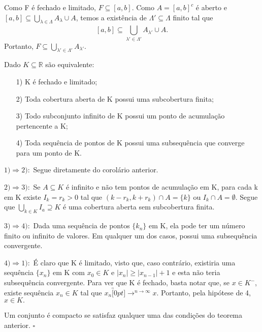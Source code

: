 \documentclass[analysis_notes.tex]{subfiles}
\begin{document}
\begin{proof*}
	Como F é fechado e limitado, $F\subseteq{[a,b]}$. Como $A=[a,b]^{c}$ é aberto e $[a,b]\subseteq{\bigcup_{\lambda \in\Lambda }^{}{A_{\lambda }}\cup{A}}$, temos
	a existência de $\Lambda '\subseteq{\Lambda }$ finito tal que
	$$
		[a,b] \subseteq{\bigcup_{\lambda '\in\Lambda '}^{}{A_{\lambda '}}\cup{A}}.
	$$
	Portanto, $F\subseteq{\bigcup_{\lambda '\in\Lambda '}^{}{A_{\lambda '}}}.$ \qedsymbol
\end{proof*}
\begin{theorem*}
	Dado $K\subseteq{\mathbb{R}}$ são equivalente:
	\begin{itemize}
		\item[1)] K é fechado e limitado;
		\item[2)] Toda cobertura aberta de K possui uma subcobertura finita;
		\item[3)] Todo subconjunto infinito de K possui um ponto de acumulação pertencente a K;
		\item[4)] Toda sequência de pontos de K possui uma subsequência que converge para um ponto de K.
	\end{itemize}
\end{theorem*}
\begin{proof*}
	$1) \Rightarrow 2):$ Segue diretamente do corolário anterior.

	$2) \Rightarrow 3):$ Se $A\subseteq{K}$ é infinito e não tem pontos de acumulação em K, para cada k em K existe $I_{k}=r_{k} > 0$
	tal que $(k-r_{k}, k+r_{k})\cap{A} = \{k\}$ ou  $I_{k}\cap A = \emptyset.$ Segue que $\bigcup_{k\in K}^{}{I_{a}}\supseteq{K}$ é
	uma cobertura aberta sem subcobertura finita.

	$3) \Rightarrow 4):$ Dada uma sequência de pontos $\{k_{n}\}$ em K, ela pode ter um número finito ou infinito de valores.
	Em qualquer um dos casos, possui uma subsequência convergente.

	$4) \Rightarrow 1):$ É claro que K é limitado, visto que, caso contrário, existiria uma sequência $\{x_{n}\}$ em K com $x_{0}\in K$
	e $|x_{n}|\geq |x_{n-1}| + 1$ e esta não teria subsequência convergente. Para ver que K é fechado, basta notar que, se $x\in K^{-}$,
	existe sequência $x_{n}\in K$ tal que $x_{n}\overbracket[0pt]{\longrightarrow}^{n\to \infty}x$. Portanto, pela hipótese de 4, $x\in K.$\qedsymbol
\end{proof*}
\begin{def*}
	Um conjunto é compacto se satisfaz qualquer uma das condições do teorema anterior. $\square$
\end{def*}
\end{document}
